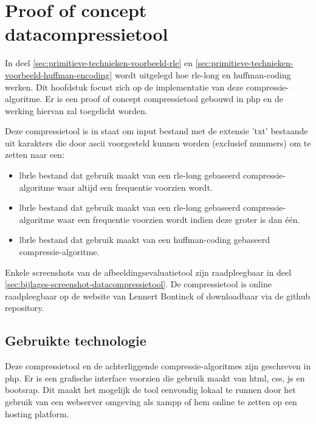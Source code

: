 \chapter{Proof of concept datacompressietool}
\label{ch:compressietool}

In deel \ref{sec:primitieve-technieken-voorbeeld-rle} en \ref{sec:primitieve-technieken-voorbeeld-huffman-encoding} wordt uitgelegd hoe \gls{rle-long} en \gls{huffman-coding} werken. Dit hoofdstuk focust zich op de implementatie van deze \gls{compressie-algoritme}. Er is een proof of concept \gls{compressietool} gebouwd in \gls{php} en de werking hiervan zal toegelicht worden. 

Deze \gls{compressietool} is in staat om input bestand met de \gls{extensie} 'txt' bestaande uit karakters die door \gls{ascii} voorgesteld kunnen worden (exclusief nummers) om te zetten naar een:

\begin{itemize}
	\item \Gls{lbrle} bestand dat gebruik maakt van een \gls{rle-long} gebaseerd \gls{compressie-algoritme} waar altijd een frequentie voorzien wordt.
	
	\item \Gls{lbrle} bestand dat gebruik maakt van een \gls{rle-long} gebaseerd \gls{compressie-algoritme} waar een frequentie voorzien wordt indien deze groter is dan één.
	
	\item \Gls{lbrle} bestand dat gebruik maakt van een \gls{huffman-coding} gebaseerd \gls{compressie-algoritme}.
\end{itemize}

Enkele screenshots van de \gls{afbeeldingsevaluatietool} zijn raadpleegbaar in deel \ref{sec:bijlages-screenshot-datacompressietool}. De \gls{compressietool} is online raadpleegbaar op de website van Lennert Bontinck of downloadbaar via de \gls{github} repository.
 
\section{Gebruikte technologie}
\label{sec:compressietool-gebruikte-technologie}

Deze \gls{compressietool} en de achterliggende \glspl{compressie-algoritme} zijn geschreven in \gls{php}. Er is een grafische interface voorzien die gebruik maakt van \gls{html}, \gls{css}, \gls{js} en \gls{bootsrap}. Dit maakt het mogelijk de tool eenvoudig lokaal te runnen door het gebruik van een webserver omgeving als \gls{xampp} of hem online te zetten op een \gls{hosting} platform.

